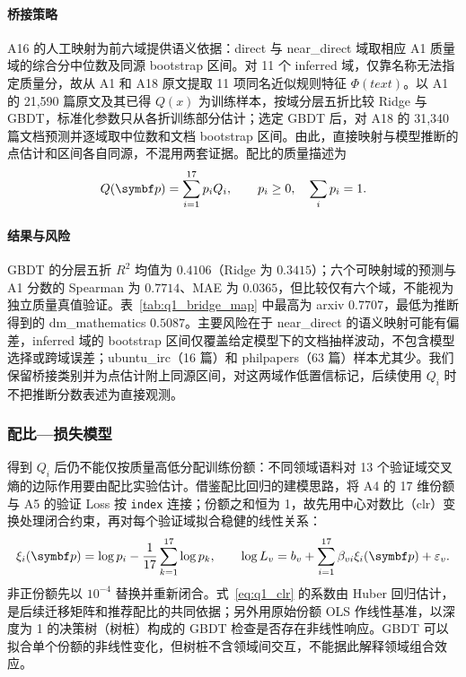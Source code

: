 \paragraph{桥接策略}A16 的人工映射为前六域提供语义依据：direct 与 near\_direct 域取相应 A1 质量域的综合分中位数及同源 bootstrap 区间。对 11 个 inferred 域，仅靠名称无法指定质量分，故从 A1 和 A18 原文提取 11 项同名近似规则特征 $\Phi(text)$。以 A1 的 21,590 篇原文及其已得 $Q(x)$ 为训练样本，按域分层五折比较 Ridge 与 GBDT，标准化参数只从各折训练部分估计；选定 GBDT 后，对 A18 的 31,340 篇文档预测并逐域取中位数和文档 bootstrap 区间。由此，直接映射与模型推断的点估计和区间各自同源，不混用两套证据。配比的质量描述为
\begin{equation}
\label{eq:q1_Qp}
Q(\bp)=\sum_{i=1}^{17}p_iQ_i,\qquad p_i\ge0,\quad \sum_i p_i=1 .
\end{equation}

\paragraph{结果与风险}GBDT 的分层五折 $R^2$ 均值为 $0.4106$（Ridge 为 $0.3415$）；六个可映射域的预测与 A1 分数的 Spearman 为 $0.7714$、MAE 为 $0.0365$，但比较仅有六个域，不能视为独立质量真值验证。表~\ref{tab:q1_bridge_map} 中最高为 arxiv $0.7707$，最低为推断得到的 dm\_mathematics $0.5087$。主要风险在于 near\_direct 的语义映射可能有偏差，inferred 域的 bootstrap 区间仅覆盖给定模型下的文档抽样波动，不包含模型选择或跨域误差；ubuntu\_irc（16 篇）和 philpapers（63 篇）样本尤其少。我们保留桥接类别并为点估计附上同源区间，对这两域作低置信标记，后续使用 $Q_i$ 时不把推断分数表述为直接观测。

\subsubsection{配比—损失模型}
\label{sec:q1_mixture}

得到 $Q_i$ 后仍不能仅按质量高低分配训练份额：不同领域语料对 13 个验证域交叉熵的边际作用要由配比实验估计。借鉴配比回归的建模思路\cite{regmix}，将 A4 的 17 维份额与 A5 的验证 Loss 按 \texttt{index} 连接；份额之和恒为 1，故先用中心对数比（clr）变换处理闭合约束\cite{aitchison}，再对每个验证域拟合稳健的线性关系：
\begin{equation}
\label{eq:q1_clr}
\xi_i(\bp)=\log p_i-\frac1{17}\sum_{k=1}^{17}\log p_k,\qquad
\log L_v=b_v+\sum_{i=1}^{17}\beta_{vi}\xi_i(\bp)+\varepsilon_v .
\end{equation}
非正份额先以 $10^{-4}$ 替换并重新闭合。式~\eqref{eq:q1_clr} 的系数由 Huber 回归估计，是后续迁移矩阵和推荐配比的共同依据；另外用原始份额 OLS 作线性基准，以深度为 1 的决策树（树桩）构成的 GBDT 检查是否存在非线性响应。GBDT 可以拟合单个份额的非线性变化，但树桩不含领域间交互，不能据此解释领域组合效应。

